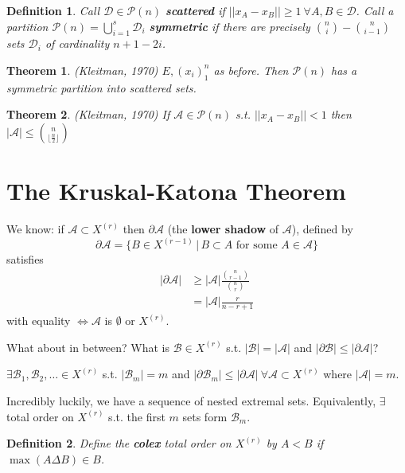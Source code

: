 \documentclass[a4paper]{article}
\newtheorem*{definition}{Definition}
\newtheorem{theorem}{Theorem}
\newcommand*\abs[1]{\left|#1\right|}
\newcommand*\norm[1]{\abs{\abs{#1}}}
\begin{document}
\begin{definition}
	Call $\mathcal{D} \in \mathcal{P}(n)$ \textbf{scattered} if $\norm{x_A - x_B} \geq 1 \ \forall A,B \in \mathcal{D}$. Call a partition $\mathcal{P}(n) = \bigcup_{i=1}^s \mathcal{D}_i$ \textbf{symmetric} if there are precisely ${n \choose i} - {n \choose i-1}$ sets $\mathcal{D}_i$ of cardinality $n+1-2i$.
\end{definition}

\begin{theorem}(Kleitman, 1970)
	$E, (x_i)_1^n$ as before. Then $\mathcal{P}(n)$ has a symmetric partition into scattered sets.
\end{theorem}

\begin{theorem}(Kleitman, 1970)
	If $\mathcal{A} \in \mathcal{P}(n)$ s.t. $\norm{x_A-x_B} < 1$ then $\abs{\mathcal{A}} \leq {n \choose {\lfloor\frac{n}{2}\rfloor}}$
\end{theorem}

\section{The Kruskal-Katona Theorem}
\setcounter{theorem}{0}
We know: if $\mathcal{A} \subset X^{(r)}$ then $\partial \mathcal{A}$ (the \textbf{lower shadow} of $\mathcal{A}$), defined by $$\partial \mathcal{A} = \{B \in X^{(r-1)} \,|\, B \subset A \text{ for some } A \in \mathcal{A}\}$$ satisfies
\begin{align*}
\abs{\partial \mathcal{A}} &\geq \abs{\mathcal{A}} \frac{{n \choose r-1}}{{n \choose r}} \\
&= \abs{\mathcal{A}}\frac{r}{n-r+1}
\end{align*}
with equality $\iff \mathcal{A}$ is $\emptyset$ or $X^{(r)}$.

What about in between? What is $\mathcal{B} \in X^{(r)}$ s.t. $\abs{\mathcal{B}} = \abs{\mathcal{A}}$ and $\abs{\partial\mathcal{B}} \leq \abs{\partial\mathcal{A}}$?

$\exists \mathcal{B}_1, \mathcal{B}_2, \dots \in X^{(r)}$ s.t. $\abs{\mathcal{B}_m} = m$ and $\abs{\partial \mathcal{B}_m} \leq \abs{\partial \mathcal{A}} \ \forall \mathcal{A} \subset X^{(r)}$ where $\abs{\mathcal{A}} = m$.

Incredibly luckily, we have a sequence of nested extremal sets. Equivalently, $\exists$ total order on $X^{(r)}$ s.t. the first $m$ sets form $\mathcal{B}_m$.

\begin{definition}
	Define the \textbf{colex} total order on $X^{(r)}$ by $A<B$ if $\max(A \Delta B) \in B$.
\end{definition}
\end{document}
